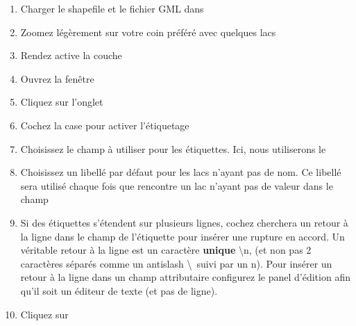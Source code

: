 \begin{enumerate}
\item Charger le shapefile  et le fichier GML  dans \qg
\item Zoomez légèrement sur votre coin préféré avec quelques lacs
\item Rendez active la couche 
\item Ouvrez la fenêtre 
\item Cliquez sur l'onglet 
\item Cochez la case  pour activer l'étiquetage
\item Choisissez le champ à utiliser pour les étiquettes. Ici, nous utiliserons 
le\\ 
\item Choisissez un libellé par défaut pour les lacs n'ayant pas de nom. Ce 
libellé sera utilisé chaque fois que \qg rencontre un lac n'ayant pas de valeur 
dans le champ 
\item Si des étiquettes s'étendent sur plusieurs lignes, cochez 
 \qg cherchera un retour à la ligne dans le 
champ de l'étiquette pour insérer une rupture en accord. Un véritable retour à 
la ligne est un caractère \textbf{unique} \textbackslash n, (et non pas 2 
caractères séparés comme un antislash \textbackslash ~suivi par un n).  Pour 
insérer un retour à la ligne dans un champ attributaire configurez le panel 
d'édition afin qu'il soit un éditeur de texte (et pas de ligne).
\item Cliquez sur 
\end{enumerate}

